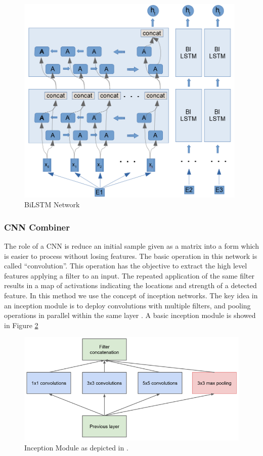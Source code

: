 \documentclass[12pt]{report}
\begin{document}
\begin{figure}[H]	
	\centering
	\includegraphics[width=110mm, scale = 1]{images/13_bilstm.png}	
	\caption{BiLSTM Network}	
	\label{figure:bilstm}
\end{figure}

  
\subsubsection{\ac{CNN} Combiner}

The role of a \ac{CNN} is reduce an initial sample given as a matrix into a form which is easier to process without losing features. The basic operation in this network is called ``convolution''. This operation has the objective to extract the high level features applying a filter to an input. The repeated application of the same filter results in a map of activations indicating the locations and strength of a detected feature. In this method we use the concept of inception networks. The key idea in an inception module is to deploy convolutions with multiple filters, and pooling operations in parallel within the same layer \cite{43022}. A basic inception module is showed in Figure \ref{figure:inception_module}

\begin{figure}[H]	
	\centering
	\includegraphics[width=130mm, scale = 1]{images/17_inception_module.png}	
	\caption{Inception Module as depicted in \cite{43022}.}	
	\label{figure:inception_module}
\end{figure}
\end{document}
